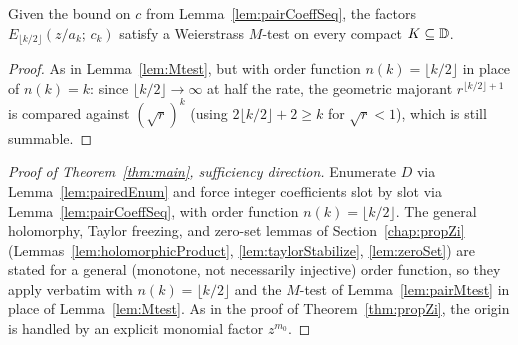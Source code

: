 \begin{lemma}
  \label{lem:pairMtest}
  \leanok
  Given the bound on $c$ from Lemma~\ref{lem:pairCoeffSeq}, the factors
  $E_{\lfloor k/2\rfloor}(z/a_k;\,c_k)$ satisfy a Weierstrass $M$-test on
  every compact $K \subseteq \mathbb{D}$.
\end{lemma}
\begin{proof}
  \leanok
  As in Lemma~\ref{lem:Mtest}, but with order function
  $n(k) = \lfloor k/2\rfloor$ in place of $n(k)=k$: since
  $\lfloor k/2 \rfloor \to \infty$ at half the rate, the geometric
  majorant $r^{\lfloor k/2\rfloor+1}$ is compared against $(\sqrt r)^k$
  (using $2\lfloor k/2\rfloor + 2 \ge k$ for $\sqrt r < 1$), which is
  still summable.
\end{proof}

\begin{proof}[Proof of Theorem~\ref{thm:main}, sufficiency direction]
  \label{lem:sufficiency}
  \leanok
  Enumerate $D$ via Lemma~\ref{lem:pairedEnum} and force integer
  coefficients slot by slot via Lemma~\ref{lem:pairCoeffSeq}, with order
  function $n(k) = \lfloor k/2\rfloor$. The general holomorphy, Taylor
  freezing, and zero-set lemmas of Section~\ref{chap:propZi}
  (Lemmas~\ref{lem:holomorphicProduct}, \ref{lem:taylorStabilize},
  \ref{lem:zeroSet}) are stated for a general (monotone, not
  necessarily injective) order function, so they apply verbatim with
  $n(k) = \lfloor k/2 \rfloor$ and the $M$-test of
  Lemma~\ref{lem:pairMtest} in place of Lemma~\ref{lem:Mtest}. As in the
  proof of Theorem~\ref{thm:propZi}, the origin is handled by an
  explicit monomial factor $z^{m_0}$.
\end{proof}
